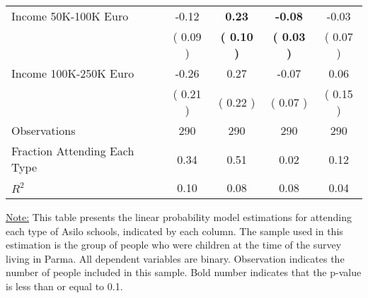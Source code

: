 \begin{table}[H]
{\begin{tabular}{lcccc}
\quad Income 50K-100K Euro &     -0.12 & \textbf{     0.23} & \textbf{    -0.08} &     -0.03 \\
\quad  & (     0.09 ) & \textbf{(     0.10 )}  & \textbf{(     0.03 )}  & (     0.07 )  \\
\quad Income 100K-250K Euro &     -0.26 &      0.27 &     -0.07 &      0.06 \\
\quad  & (     0.21 ) & (     0.22 )  & (     0.07 )  & (     0.15 )  \\
\midrule
Observations & 290 & 290 & 290 & 290 \\
Fraction Attending Each Type &      0.34 &      0.51 &      0.02 &      0.12 \\
\midrule
$ R^2$ &      0.10 &      0.08 &      0.08 &      0.04 \\
\bottomrule
\end{tabular}}
\end{table}
\begin{footnotesize}
\noindent\underline{Note:} This table presents the linear probability model estimations for attending each type of Asilo schools, indicated by each column. The sample used in this estimation is the group of people who were children at the time of the survey living in Parma. All dependent variables are binary. Observation indicates the number of people included in this sample. Bold number indicates that the p-value is less than or equal to 0.1.
\end{footnotesize}
